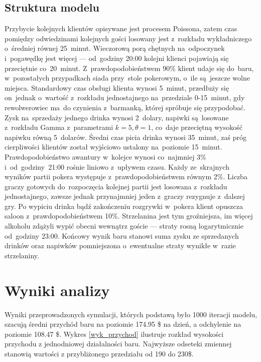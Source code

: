 \documentclass[12pt, a4paper, oneside]{mwart} %
\begin{document}
\subsection{Struktura modelu}
Przybycie kolejnych klientów opisywane jest procesem Poissona, zatem czas pomiędzy odwiedzinami kolejnych gości losowany jest z~rozkładu wykładniczego o~średniej równej 25~minut. Wieczorową porą chętnych na~odpoczynek i~pogawędkę jest więcej --- od~godziny 20:00 kolejni klienci pojawiają się przeciętnie co~20~minut. Z~prawdopodobieństwem 90\% klient udaje się do~baru, w~pozostałych przypadkach siada przy~stole pokerowym, o~ile są~jeszcze wolne miejsca. Standardowy czas obsługi klienta wynosi 5~minut, przedłuży się on~jednak o~wartość z~rozkładu jednostajnego na~przedziale 0-15~minut, gdy rewolwerowiec ma~do czynienia z~barmanką, której spróbuje się przypodobać. Zysk na~sprzedaży jednego drinka wynosi 2~dolary, napiwki są~losowane z~rozkładu Gamma z~parametrami $k = 5, \theta = 1$, co~daje przeciętną wysokość napiwku równą 5~dolarów. Średni czas picia drinka wynosi 35~minut, zaś próg cierpliwości klientów został wyjściowo ustalony na~poziomie 15~minut. Prawdopodobieństwo awantury w~kolejce wynosi co~najmniej 3\% i~od~godziny~21:00 rośnie liniowo z~upływem czasu. Każdy ze~skrajnych wyników partii pokera występuje z~prawdopodobieństwem równym 2\%. Liczba graczy gotowych do~rozpoczęcia kolejnej partii jest losowana z~rozkładu jednostajnego, zawsze jednak przynajmniej jeden z~graczy rezygnuje z~dalszej gry. Po wypiciu drinka bądź zakończeniu rozgrywki w~pokera klient opuszcza saloon z~prawdopodobieństwem 10\%. Strzelanina jest tym groźniejsza, im więcej alkoholu zdążyli wypić obecni wewnątrz goście --- straty rosną logarytmicznie od~godziny 23:00. Końcowy wynik baru stanowi suma zysku ze sprzedanych drinków oraz napiwków pomniejszona o~ewentualne straty wynikłe w~razie strzelaniny.

\section{Wyniki analizy}
Wyniki przeprowadzonych symulacji, których podstawą było 1000 iteracji modelu, szacują średni przychód baru na poziomie 174.95 \$ na dzień, a odchylenie na poziomie 108.47 \$. Wykres \ref{wyk_przychod} ilustruje rozkład wysokości przychodu z jednodniowej działalności baru. Najwyższe odseteki zmiennej stanowią wartości z przybliżonego przedziału od 190 do 230\$.
\end{document}
